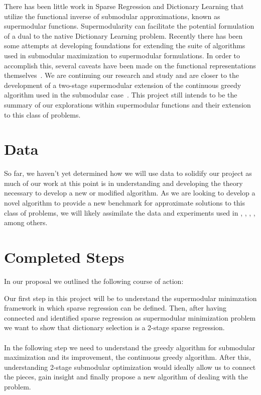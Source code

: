 \documentclass{article}
\begin{document}
\noindent There has been little work in Sparse Regression and Dictionary Learning that utilize the functional inverse of submodular approximations, known as supermodular functions. Supermodularity can facilitate the potential formulation of a dual to the native Dictionary Learning problem. Recently there has been some attempts at developing foundations for extending the suite of algorithms used in submodular maximization to supermodular formulations. In order to accomplish this, several caveats have been made on the functional representations themselves~\cite{BoutsidisLS15}. We are continuing our research and study and are closer to the development of a two-stage supermodular extension of the continuous greedy algorithm used in the submodular case~\cite{Singer16TwoStage}. This project still intends to be the summary of our explorations within supermodular functions and their extension to this class of problems.


\section{Data}
So far, we haven't yet determined how we will use data to solidify our project as much of our work at this point is in understanding and developing the theory necessary to develop a new or modified algorithm. As we are looking to develop a novel algorithm to provide a new benchmark for approximate solutions to this class of problems, we will likely assimilate the data and experiments used in  \cite{submod_spectral}, \cite{greedy_selection}, \cite{rIBP}, \cite{Singer16TwoStage}, among others. 


\section{Completed Steps}

In our proposal we outlined the following course of action:
\begin{displayquote}
Our first step in this project will be to understand the supermodular minimzation framework in which sparse regression can be defined. Then, after having connected and identified sparse regression as supermodular minimization problem we want to show that dictionary selection is a 2-stage sparse regression. \\
\\
In the following step we need to understand the greedy algorithm for submodular maximization and its improvement, the continuous greedy algorithm. After this, understanding 2-stage submodular optimization would ideally allow us to connect the pieces, gain insight and finally propose a new algorithm of dealing with the problem.
\end{displayquote}
\end{document}
